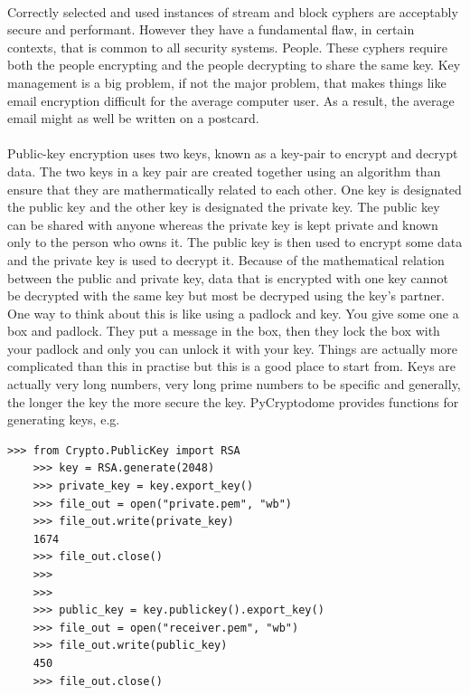 \documentclass[12pt, a4paper, oneside]{book}
\begin{document}
{\paragraph{} Correctly selected and used instances of stream and block cyphers are acceptably secure and performant. However they have a fundamental flaw, in certain contexts, that is common to all security systems. People. These cyphers require both the people encrypting and the people decrypting to share the same key. Key management is a big problem, if not the major problem, that makes things like email encryption difficult for the average computer user. As a result, the average email might as well be written on a postcard.

\paragraph{} Public-key encryption uses two keys, known as a key-pair to encrypt and decrypt data. The two keys in a key pair are created together using an algorithm than ensure that they are mathermatically related to each other. One key is designated the public key and the other key is designated the private key. The public key can be shared with anyone whereas the private key is kept private and known only to the person who owns it. The public key is then used to encrypt some data and the private key is used to decrypt it. Because of the mathematical relation between the public and private key, data that is encrypted with one key cannot be decrypted with the same key but most be decryped using the key's partner. One way to think about this is like using a padlock and key. You give some one a box and padlock. They put a message in the box, then they lock the box with your padlock and only you can unlock it with your key. Things are actually more complicated than this in practise but this is a good place to start from. Keys are actually very long numbers, very long prime numbers to be specific and generally, the longer the key the more secure the key. PyCryptodome provides functions for generating keys, e.g.

\begin{lstlisting}[style=DOS]
    >>> from Crypto.PublicKey import RSA
    >>> key = RSA.generate(2048)
    >>> private_key = key.export_key()
    >>> file_out = open("private.pem", "wb")
    >>> file_out.write(private_key)
    1674
    >>> file_out.close()
    >>> 
    >>> 
    >>> public_key = key.publickey().export_key()
    >>> file_out = open("receiver.pem", "wb")
    >>> file_out.write(public_key)
    450
    >>> file_out.close()
\end{lstlisting}

}
\end{document}
